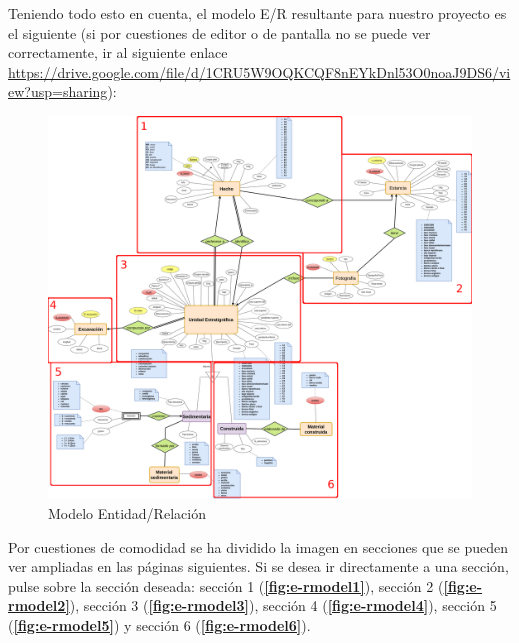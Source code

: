     Teniendo todo esto en cuenta, el modelo E/R resultante para nuestro proyecto es el
    siguiente (si por cuestiones de editor o de pantalla no se puede ver correctamente,
    ir al siguiente enlace 
    \url{https://drive.google.com/file/d/1CRU5W9OQKCQF8nEYkDnl53O0noaJ9DS6/view?usp=sharing}):

        \begin{figure}[H]
            \centering
            \includegraphics[scale=0.15]{imagenes/E-RModel.png}
            \caption{Modelo Entidad/Relación}
            \label{fig:e-rmodel}
        \end{figure}

    Por cuestiones de comodidad se ha dividido la imagen en secciones que se pueden ver
    ampliadas en las páginas siguientes. Si se desea ir directamente a una sección, pulse
    sobre la sección deseada: sección 1 (\textbf{\ref{fig:e-rmodel1}}), sección 2
    (\textbf{\ref{fig:e-rmodel2}}), sección 3 (\textbf{\ref{fig:e-rmodel3}}), sección 4
    (\textbf{\ref{fig:e-rmodel4}}), sección 5 (\textbf{\ref{fig:e-rmodel5}}) y sección 6
    (\textbf{\ref{fig:e-rmodel6}}).

